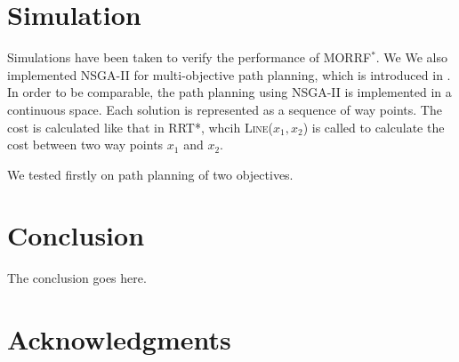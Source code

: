 \documentclass[conference]{IEEEtran}
\theoremstyle{definition}
\begin{document}
\section{Simulation}
\label{sec:simulation}

Simulations have been taken to verify the performance of MORRF$^{*}$.
We 
We also implemented NSGA-II for multi-objective path planning, which is introduced in \cite{Ahmed2013}.
In order to be comparable, the path planning using NSGA-II is implemented in a continuous space.
Each solution is represented as a sequence of way points.
The cost is calculated like that in RRT*, whcih \textsc{Line}($ x_{1}, x_{2} $) is called to calculate the cost between two way points $ x_{1} $ and $ x_{2} $.


We tested firstly on path planning of two objectives.





\section{Conclusion} 
\label{sec:conclusion}

The conclusion goes here.

\section*{Acknowledgments}




\end{document}
